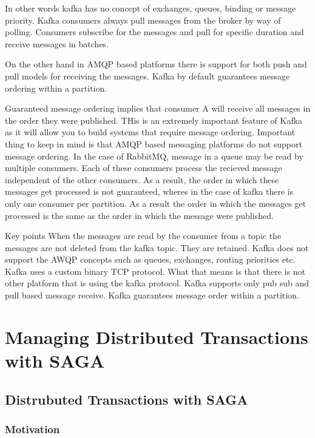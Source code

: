\documentclass[a4paper, 11pt]{book}
\begin{document}
    In other words kafka has no concept of exchanges, queues, binding or message priority.
    Kafka consumers always pull messages from the broker by way of polling.
    Consumers subscribe for the messages and pull for specific duration and receive messages in batches.

    On the other hand in AMQP based platforms there is support for both push and pull models for receiving the messages.
    Kafka by default guarantees message ordering within a partition.

    Guaranteed message ordering implies that consumer A will receive all messages in the order they were published.
    THis is an extremely important feature of Kafka as it will allow you to build systems that require message ordering.
    Important thing to keep in mind is that AMQP based messaging platforms do not support message ordering.
    In the case of RabbitMQ, message in a queue may be read by multiple consumers.
    Each of these consumers process the recieved message independent of the other consumers.
    As a result, the order in which these messages get processed is not guaranteed, wheres in the case of kafka there is only one consumer per partition.
    As a result the order in which the messages get processed is the same as the order in which the message were published.

    Key points
    When the messages are read by the consumer from a topic the messages are not deleted from the kafka topic. They are retained.
    Kafka does not support the AWQP concepts such as queues, exchanges, routing priorities etc.
    Kafka uses a custom binary TCP protocol.
    What that means is that there is not other platform that is using the kafka protocol.
    Kafka supports only pub sub and pull based message receive.
    Kafka guarantees message order within a partition.



    \chapter{Managing Distributed Transactions with SAGA}

    \section{Distrubuted Transactions with SAGA}

    \subsection{Motivation}
\end{document}
